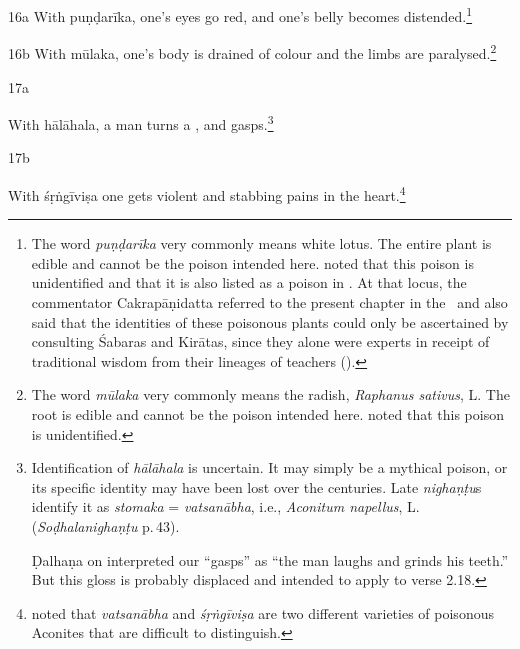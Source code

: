 \begin{translation}
\item[16a] With \gls{puṇḍarīka},  
        one's eyes go red, and one's belly becomes
        distended.\footnote{The word \emph{puṇḍarīka} very commonly means
            white lotus. The entire plant is
            edible and cannot be the poison intended here. \citet[252]{gvdb}
            noted that this poison is unidentified and that it is also listed
            as a poison in .  At that locus, the commentator 
            Cakrapāṇidatta referred to the present chapter in the \SS\ and also said 
            that the identities of these poisonous plants could only be ascertained 
            by consulting Śabaras and Kirātas, since they alone were experts in 
            receipt of traditional wisdom from their lineages of teachers 
            ().}

\item[16b] With \gls{mūlaka},    
            one's body is drained of colour and the limbs are
            paralysed.\footnote{The word \emph{mūlaka} very commonly means
                the radish, \emph{Raphanus sativus}, L. The root is edible and
                cannot be the poison intended here. \citet[317]{gvdb} noted that
                this poison is unidentified.}
    
    \item[17a]
        
    With \gls{hālāhala}, a man turns a , and
gasps.\footnote{Identification of \emph{hālāhala} is  uncertain. It may simply
be a mythical poison, or its specific identity may have been lost over the
centuries. Late \emph{nighaṇṭu}s identify it as \emph{stomaka} =
\emph{vatsanābha}, i.e., \emph{Aconitum napellus}, L. 
(\emph{Soḍhalanighaṇṭu} p.\,43). 

Ḍalhaṇa on  interpreted our “gasps” as “the man laughs 
and grinds his teeth.”  But this gloss is probably displaced and intended to 
apply to verse 2.18.}


\item[ 17b] 

With \gls{śṛṅgīviṣa}
one gets violent
 and stabbing pains in the 
heart.\footnote{\citet[407]{gvdb} noted that \emph{vatsanābha} and 
\emph{śṛṅgīviṣa} are two different varieties of poisonous Aconites that are 
difficult to distinguish.}
    

\end{translation}
